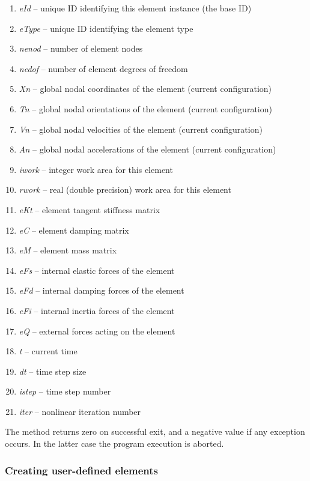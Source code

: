\begin{enumerate}
\item{\sl eId} --
  unique ID identifying this element instance (the base ID)
\item{\sl eType} --
  unique ID identifying the element type
\item{\sl nenod} --
  number of element nodes
\item{\sl nedof} --
  number of element degrees of freedom
\item{\sl Xn} --
  global nodal coordinates of the element (current configuration)
\item{\sl Tn} --
  global nodal orientations of the element (current configuration)
\item{\sl Vn} --
  global nodal velocities of the element (current configuration)
\item{\sl An} --
  global nodal accelerations of the element (current configuration)
\item{\sl iwork} --
  integer work area for this element
\item{\sl rwork} --
  real (double precision) work area for this element
\item{\sl eKt} --
  element tangent stiffness matrix
\item{\sl eC} --
  element damping matrix
\item{\sl eM} --
  element mass matrix
\item{\sl eFs} --
  internal elastic forces of the element
\item{\sl eFd} --
  internal damping forces of the element
\item{\sl eFi} --
  internal inertia forces of the element
\item{\sl eQ} --
  external forces acting on the element
\item{\sl t} --
  current time
\item{\sl dt} --
  time step size
\item{\sl istep} --
  time step number
\item{\sl iter} --
  nonlinear iteration number
\end{enumerate}

The method returns zero on successful exit, and a negative value if any
exception occurs. In the latter case the program execution is aborted.

\subsubsection{Creating user-defined elements}


